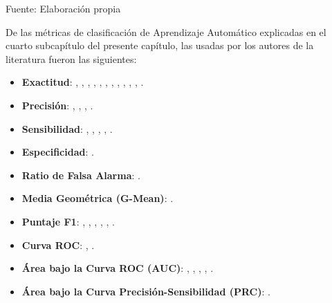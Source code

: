 \begin{flushleft}	%
	\small Fuente: Elaboración propia
\end{flushleft}


De las métricas de clasificación de Aprendizaje Automático explicadas en el cuarto subcapítulo del presente capítulo, las usadas por los autores de la literatura fueron las siguientes:

\begin{itemize}
	\item \textbf{Exactitud}: \cite{pr_chen2013kickpredict}, \cite{pr_chen2015predcrowd}, \cite{pr_beckwith2016predcrowd}, \cite{pr_yuan2016textanalytics}, \cite{pr_sawhney2016usingLT}, \cite{pr_kaur2017socmedcrowd}, \cite{pr_kamath2018suplearn}, \cite{pr_yu2018deeplearning}, \cite{pr_lee2018contentDL}, \cite{pr_cheng2019deeplearning}, \cite{pr_chen2019keywords_crowdfunding}, \cite{pr_shafqat2019topicpredictions}.
	\item \textbf{Precisión}: \cite{pr_beckwith2016predcrowd}, \cite{pr_yuan2016textanalytics}, \cite{pr_kaur2017socmedcrowd}, \cite{pr_cheng2019deeplearning}.
	\item \textbf{Sensibilidad}: \cite{pr_beckwith2016predcrowd}, \cite{pr_yuan2016textanalytics}, \cite{pr_kaur2017socmedcrowd}, \cite{pr_cheng2019deeplearning}, \cite{pr_chen2019keywords_crowdfunding}.
	\item \textbf{Especificidad}: \cite{pr_chen2019keywords_crowdfunding}.
	\item \textbf{Ratio de Falsa Alarma}: \cite{pr_kaur2017socmedcrowd}.
	\item \textbf{Media Geométrica (G-Mean)}: \cite{pr_chen2019keywords_crowdfunding}.
	\item \textbf{Puntaje F1}: \cite{pr_zhou2015projectdesc}, \cite{pr_beckwith2016predcrowd}, \cite{pr_yuan2016textanalytics}, \cite{pr_kaur2017socmedcrowd}, \cite{pr_cheng2019deeplearning}, \cite{pr_chen2019keywords_crowdfunding}.
	\item \textbf{Curva ROC}: \cite{pr_zhou2015projectdesc}, \cite{pr_beckwith2016predcrowd}.
	\item \textbf{Área bajo la Curva ROC (AUC)}: \cite{pr_beckwith2016predcrowd}, \cite{pr_li2016predcrowd}, \cite{pr_kaur2017socmedcrowd}, \cite{pr_yu2018deeplearning}, \cite{pr_cheng2019deeplearning}.
	\item \textbf{Área bajo la Curva Precisión-Sensibilidad (PRC)}: \cite{pr_kaur2017socmedcrowd}.

\end{itemize}
